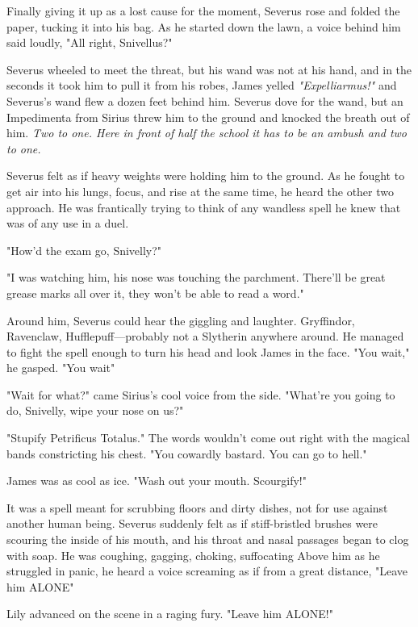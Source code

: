 Finally giving it up as a lost cause for the moment, Severus rose and folded the paper, tucking it into his bag. As he started down the lawn, a voice behind him said loudly, "All right, Snivellus?"

Severus wheeled to meet the threat, but his wand was not at his hand, and in the seconds it took him to pull it from his robes, James yelled \emph{"Expelliarmus!"} and Severus's wand flew a dozen feet behind him. Severus dove for the wand, but an Impedimenta from Sirius threw him to the ground and knocked the breath out of him. \emph{Two to one. Here in front of half the school it has to be an ambush and two to one.}

Severus felt as if heavy weights were holding him to the ground. As he fought to get air into his lungs, focus, and rise at the same time, he heard the other two approach. He was frantically trying to think of any wandless spell he knew that was of any use in a duel.

"How'd the exam go, Snivelly?"

"I was watching him, his nose was touching the parchment. There'll be great grease marks all over it, they won't be able to read a word."

Around him, Severus could hear the giggling and laughter. Gryffindor, Ravenclaw, Hufflepuff—probably not a Slytherin anywhere around. He managed to fight the spell enough to turn his head and look James in the face. "You{\el} wait," he gasped. "You{\el} wait{\el}"

"Wait for what?" came Sirius's cool voice from the side. "What're you going to do, Snivelly, wipe your nose on us?"

"Stu{\el}pify{\el} Petri{\el}ficus To{\el}talus." The words wouldn't come out right with the magical bands constricting his chest. "You cow{\el}ardly bas{\el}tard. You can{\el} go to{\el} hell."

James was as cool as ice. "Wash out your mouth. Scourgify!"

It was a spell meant for scrubbing floors and dirty dishes, not for use against another human being. Severus suddenly felt as if stiff-bristled brushes were scouring the inside of his mouth, and his throat and nasal passages began to clog with soap. He was coughing, gagging, choking, suffocating{\el} Above him as he struggled in panic, he heard a voice screaming as if from a great distance, "Leave him ALONE{\el}"

Lily advanced on the scene in a raging fury. "Leave him ALONE!"

